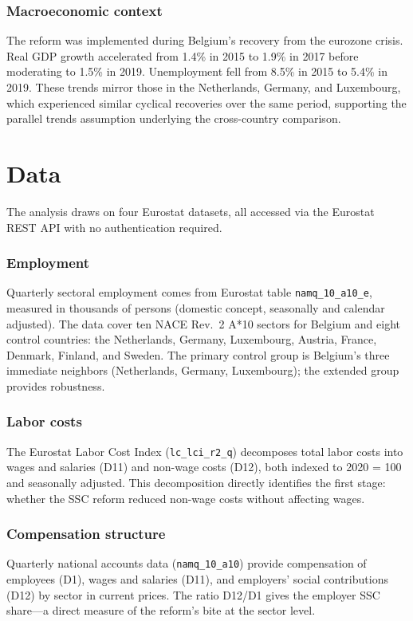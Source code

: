 \documentclass[12pt]{article}
\begin{document}
\subsubsection*{Macroeconomic context} The reform was implemented during Belgium's recovery from the eurozone crisis. Real GDP growth accelerated from 1.4\% in 2015 to 1.9\% in 2017 before moderating to 1.5\% in 2019. Unemployment fell from 8.5\% in 2015 to 5.4\% in 2019. These trends mirror those in the Netherlands, Germany, and Luxembourg, which experienced similar cyclical recoveries over the same period, supporting the parallel trends assumption underlying the cross-country comparison.

\section{Data} \label{sec:data}

The analysis draws on four Eurostat datasets, all accessed via the Eurostat REST API with no authentication required.

\subsubsection*{Employment} Quarterly sectoral employment comes from Eurostat table \texttt{namq\_10\_a10\_e}, measured in thousands of persons (domestic concept, seasonally and calendar adjusted). The data cover ten NACE Rev.~2 A*10 sectors for Belgium and eight control countries: the Netherlands, Germany, Luxembourg, Austria, France, Denmark, Finland, and Sweden. The primary control group is Belgium's three immediate neighbors (Netherlands, Germany, Luxembourg); the extended group provides robustness.

\subsubsection*{Labor costs} The Eurostat Labor Cost Index (\texttt{lc\_lci\_r2\_q}) decomposes total labor costs into wages and salaries (D11) and non-wage costs (D12), both indexed to 2020 = 100 and seasonally adjusted. This decomposition directly identifies the first stage: whether the SSC reform reduced non-wage costs without affecting wages.

\subsubsection*{Compensation structure} Quarterly national accounts data (\texttt{namq\_10\_a10}) provide compensation of employees (D1), wages and salaries (D11), and employers' social contributions (D12) by sector in current prices. The ratio D12/D1 gives the employer SSC share---a direct measure of the reform's bite at the sector level.
\end{document}
